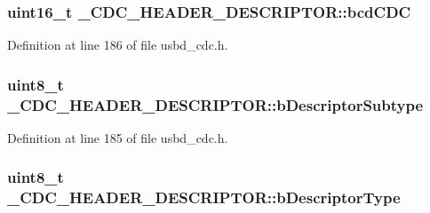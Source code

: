 \subsubsection[{\texorpdfstring{bcd\+C\+DC}{bcdCDC}}]{\setlength{\rightskip}{0pt plus 5cm}uint16\+\_\+t \+\_\+\+C\+D\+C\+\_\+\+H\+E\+A\+D\+E\+R\+\_\+\+D\+E\+S\+C\+R\+I\+P\+T\+O\+R\+::bcd\+C\+DC}\hypertarget{struct__CDC__HEADER__DESCRIPTOR_a2650cd685ca91a2b3d3c046057287d46}{}\label{struct__CDC__HEADER__DESCRIPTOR_a2650cd685ca91a2b3d3c046057287d46}


Definition at line 186 of file usbd\+\_\+cdc.\+h.

\subsubsection[{\texorpdfstring{b\+Descriptor\+Subtype}{bDescriptorSubtype}}]{\setlength{\rightskip}{0pt plus 5cm}uint8\+\_\+t \+\_\+\+C\+D\+C\+\_\+\+H\+E\+A\+D\+E\+R\+\_\+\+D\+E\+S\+C\+R\+I\+P\+T\+O\+R\+::b\+Descriptor\+Subtype}\hypertarget{struct__CDC__HEADER__DESCRIPTOR_a8023a40a5a8e7231ad509f2f1427e37b}{}\label{struct__CDC__HEADER__DESCRIPTOR_a8023a40a5a8e7231ad509f2f1427e37b}


Definition at line 185 of file usbd\+\_\+cdc.\+h.

\subsubsection[{\texorpdfstring{b\+Descriptor\+Type}{bDescriptorType}}]{\setlength{\rightskip}{0pt plus 5cm}uint8\+\_\+t \+\_\+\+C\+D\+C\+\_\+\+H\+E\+A\+D\+E\+R\+\_\+\+D\+E\+S\+C\+R\+I\+P\+T\+O\+R\+::b\+Descriptor\+Type}\hypertarget{struct__CDC__HEADER__DESCRIPTOR_acd21e37337cf4879585dfe4b13747b9c}{}\label{struct__CDC__HEADER__DESCRIPTOR_acd21e37337cf4879585dfe4b13747b9c}


